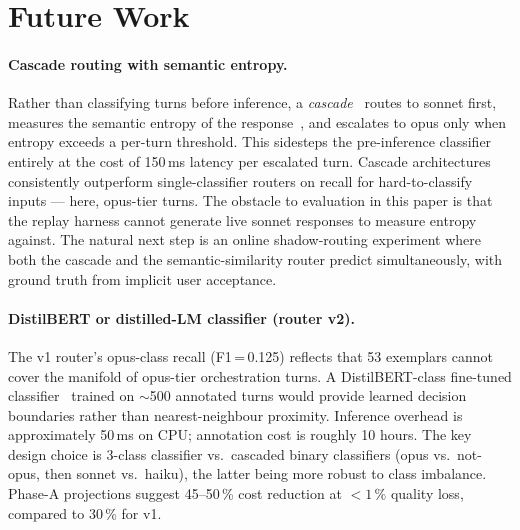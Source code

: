 \section{Future Work}
\label{sec:future}

\paragraph{Cascade routing with semantic entropy.}
Rather than classifying turns before inference, a \emph{cascade}~\cite{frugalgpt,cascaderouting} routes to sonnet first, measures the semantic entropy of the response~\cite{semanticentropy}, and escalates to opus only when entropy exceeds a per-turn threshold. This sidesteps the pre-inference classifier entirely at the cost of 150\,ms latency per escalated turn. Cascade architectures consistently outperform single-classifier routers on recall for hard-to-classify inputs --- here, opus-tier turns. The obstacle to evaluation in this paper is that the replay harness cannot generate live sonnet responses to measure entropy against. The natural next step is an online shadow-routing experiment where both the cascade and the semantic-similarity router predict simultaneously, with ground truth from implicit user acceptance.

\paragraph{DistilBERT or distilled-LM classifier (router v2).}
The v1 router's opus-class recall (F1\,=\,0.125) reflects that 53 exemplars cannot cover the manifold of opus-tier orchestration turns. A DistilBERT-class fine-tuned classifier~\cite{routellm} trained on \(\sim\)500 annotated turns would provide learned decision boundaries rather than nearest-neighbour proximity. Inference overhead is approximately 50\,ms on CPU; annotation cost is roughly 10 hours. The key design choice is 3-class classifier vs.\ cascaded binary classifiers (opus vs.\ not-opus, then sonnet vs.\ haiku), the latter being more robust to class imbalance. Phase-A projections suggest 45--50\,\% cost reduction at \(<1\,\%\) quality loss, compared to 30\,\% for v1.

